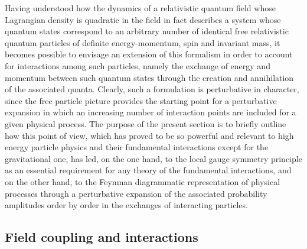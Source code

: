 \documentclass[a4paper,11pt]{article}
\begin{document}
Having understood how the dynamics of a relativistic quantum field
whose Lagrangian density is quadratic in the field in fact describes
a system whose quantum states correspond to an arbitrary number of
identical free relativistic quantum particles of definite energy-momentum,
spin and invariant mass, it becomes possible to envisage an extension of this
formalism in order to account for interactions among such particles,
namely the exchange of energy and momentum between such quantum states
through the creation and annihilation of the associated quanta. Clearly,
such a formulation is perturbative in character, since the free particle
picture provides the starting point for a perturbative expansion in
which an increasing number of interaction points are included for a given
physical process. The purpose of the present section is to briefly
outline how this point of view, which has proved to be so powerful and
relevant to high energy particle physics and their fundamental interactions
except for the gravitational one, has led, on the one hand, to the local 
gauge symmetry principle as an essential requirement for any theory of the 
fundamental interactions, and on the other hand, to the Feynman diagrammatic 
representation of physical processes through a perturbative expansion of 
the associated probability amplitudes order by order in the exchanges of 
interacting particles.

\subsection{Field coupling and interactions}
\label{Subsect4.1}
\end{document}
